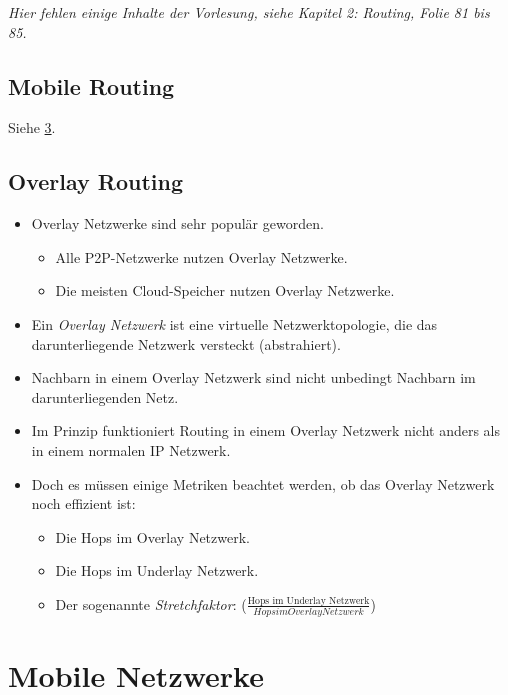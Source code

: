 \documentclass[a4paper, 11pt, accentcolor = tud3b]{tudreport}
\begin{document}
                    \textit{Hier fehlen einige Inhalte der Vorlesung, siehe Kapitel 2: Routing, Folie 81 bis 85.}
        
        \section{Mobile Routing}
	        Siehe \ref{c:mobile_networks}.
        
        \section{Overlay Routing}
	        \begin{itemize}
	        	\item Overlay Netzwerke sind sehr populär geworden.
		        	\begin{itemize}
		        		\item Alle P2P-Netzwerke nutzen Overlay Netzwerke.
		        		\item Die meisten Cloud-Speicher nutzen Overlay Netzwerke.
		        	\end{itemize}
		        \item Ein \textit{Overlay Netzwerk} ist eine virtuelle Netzwerktopologie, die das darunterliegende Netzwerk versteckt (abstrahiert).
		        \item Nachbarn in einem Overlay Netzwerk sind nicht unbedingt Nachbarn im darunterliegenden Netz.
		        \item Im Prinzip funktioniert Routing in einem Overlay Netzwerk nicht anders als in einem normalen IP Netzwerk.
		        \item Doch es müssen einige Metriken beachtet werden, ob das Overlay Netzwerk noch effizient ist:
			        \begin{itemize}
			        	\item Die Hops im Overlay Netzwerk.
			        	\item Die Hops im Underlay Netzwerk.
			        	\item Der sogenannte \textit{Stretchfaktor}: (\( \frac{\text{Hops im Underlay Netzwerk}}{Hops im Overlay Netzwerk} \))
			        \end{itemize}
	        \end{itemize}
                
    \chapter{Mobile Netzwerke}
	    \label{c:mobile_networks}
    
\end{document}
